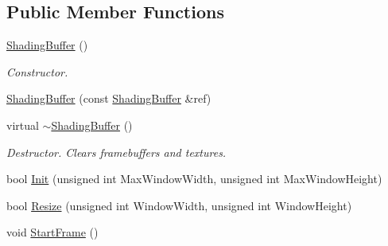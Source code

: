 \subsection*{Public Member Functions}
\begin{DoxyCompactItemize}
\item 
\mbox{\label{class_geometry_engine_1_1_geometry_buffer_1_1_shading_buffer_a375864e326e5733c2880d0cfb43f9574}} 
\mbox{\hyperlink{class_geometry_engine_1_1_geometry_buffer_1_1_shading_buffer_a375864e326e5733c2880d0cfb43f9574}{Shading\+Buffer}} ()
\begin{DoxyCompactList}\small\item\em Constructor. \end{DoxyCompactList}\item 
\mbox{\hyperlink{class_geometry_engine_1_1_geometry_buffer_1_1_shading_buffer_af5039da17d98b71245360dc575b14964}{Shading\+Buffer}} (const \mbox{\hyperlink{class_geometry_engine_1_1_geometry_buffer_1_1_shading_buffer}{Shading\+Buffer}} \&ref)
\item 
\mbox{\label{class_geometry_engine_1_1_geometry_buffer_1_1_shading_buffer_ad66b79cdca19d85cf3fd10f93dca7a96}} 
virtual \mbox{\hyperlink{class_geometry_engine_1_1_geometry_buffer_1_1_shading_buffer_ad66b79cdca19d85cf3fd10f93dca7a96}{$\sim$\+Shading\+Buffer}} ()
\begin{DoxyCompactList}\small\item\em Destructor. Clears framebuffers and textures. \end{DoxyCompactList}\item 
bool \mbox{\hyperlink{class_geometry_engine_1_1_geometry_buffer_1_1_shading_buffer_af1fdd3ca773dce41a4fbe4bec2df12fa}{Init}} (unsigned int Max\+Window\+Width, unsigned int Max\+Window\+Height)
\item 
bool \mbox{\hyperlink{class_geometry_engine_1_1_geometry_buffer_1_1_shading_buffer_a154d3f1ba318675149ebac34471e0aec}{Resize}} (unsigned int Window\+Width, unsigned int Window\+Height)
\item 
\mbox{\label{class_geometry_engine_1_1_geometry_buffer_1_1_shading_buffer_afd99bbade98d64de94ba7a91c71ac8b9}} 
void \mbox{\hyperlink{class_geometry_engine_1_1_geometry_buffer_1_1_shading_buffer_afd99bbade98d64de94ba7a91c71ac8b9}{Start\+Frame}} ()

\end{DoxyCompactItemize}
